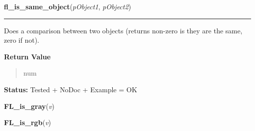 \hspace{.8\funcindent}\begin{boxedminipage}{\funcwidth}

    \raggedright \textbf{fl\_is\_same\_object}(\textit{pObject1}, \textit{pObject2})

    \vspace{-1.5ex}

    \rule{\textwidth}{0.5\fboxrule}
\setlength{\parskip}{2ex}
    Does a comparison between two objects (returns non-zero is they are the
    same, zero if not).

\setlength{\parskip}{1ex}
      \textbf{Return Value}
    \vspace{-1ex}

      \begin{quote}
      num

      \end{quote}

\textbf{Status:} Tested + NoDoc + Example = OK



    \end{boxedminipage}

    \label{xformslib:library:FL_is_gray}

    \vspace{0.5ex}

\hspace{.8\funcindent}\begin{boxedminipage}{\funcwidth}

    \raggedright \textbf{FL\_is\_gray}(\textit{v})

\setlength{\parskip}{2ex}
\setlength{\parskip}{1ex}
    \end{boxedminipage}

    \label{xformslib:library:FL_is_rgb}

    \vspace{0.5ex}

\hspace{.8\funcindent}\begin{boxedminipage}{\funcwidth}

    \raggedright \textbf{FL\_is\_rgb}(\textit{v})

\setlength{\parskip}{2ex}
\setlength{\parskip}{1ex}
    \end{boxedminipage}

